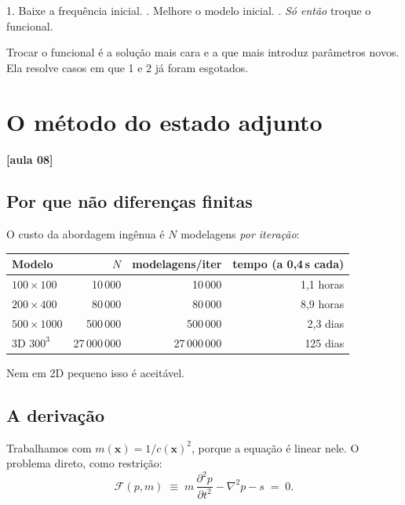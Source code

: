 \documentclass[11pt,a4paper,oneside]{report}
\newcommand{\aula}[1]{\textcolor{cianofwi}{\textbf{[aula #1]}}}
\begin{document}
\begin{pratica}
1. Baixe a frequência inicial. . Melhore o modelo inicial. . \emph{Só então} troque o funcional.

Trocar o funcional é a solução mais cara e a que mais introduz parâmetros
novos. Ela resolve casos em que 1 e 2 já foram esgotados.
\end{pratica}

\chapter{O método do estado adjunto}
\label{cap:adjunto}

\aula{08}

\section{Por que não diferenças finitas}

O custo da abordagem ingênua é $N$ modelagens \emph{por iteração}:

\begin{center}
\begin{tabular}{@{}lrrr@{}}
\toprule
\textbf{Modelo} & $N$ & \textbf{modelagens/iter} & \textbf{tempo (a 0{,}4\,s cada)} \\
\midrule
$100\times100$   & 10\,000     & 10\,000     & 1{,}1 horas \\
$200\times400$   & 80\,000     & 80\,000     & 8{,}9 horas \\
$500\times1000$  & 500\,000    & 500\,000    & 2{,}3 dias \\
3D $300^{3}$     & 27\,000\,000& 27\,000\,000& 125 dias \\
\bottomrule
\end{tabular}
\end{center}

Nem em 2D pequeno isso é aceitável.

\section{A derivação}

Trabalhamos com $m(\mathbf{x}) = 1/c(\mathbf{x})^{2}$, porque a equação é
linear nele. O problema direto, como restrição:
\begin{equation}
\mathcal{F}(p,m) \;\equiv\; m\,\frac{\partial^{2}p}{\partial t^{2}}
 - \nabla^{2}p - s \;=\; 0 .
\end{equation}
\end{document}
